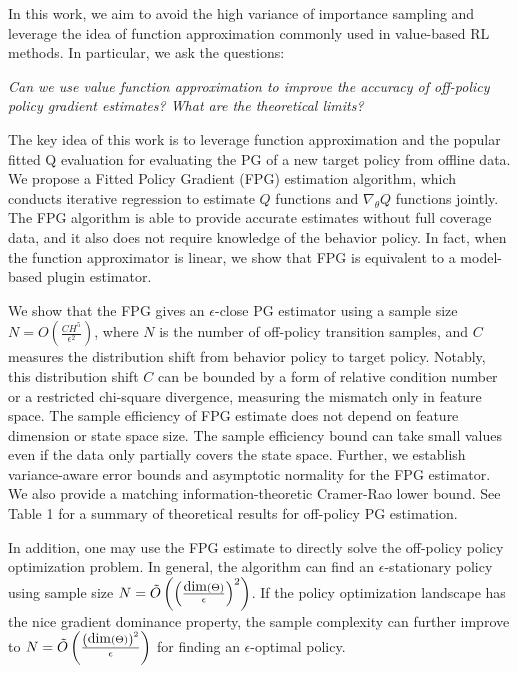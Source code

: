\documentclass{article}
\def\mw#1{\textcolor{red}{#1}}
\numberwithin{equation}{section}
\begin{document}
In this work, we aim to avoid the high variance of importance sampling and leverage the idea of function approximation commonly used in value-based RL methods. In particular, we ask the questions: 
\begin{center}
    \it{Can we use value function approximation to improve the accuracy of off-policy policy gradient estimates? What are the theoretical limits?}
\end{center}
The key idea of this work is to 
leverage function approximation and the popular fitted Q evaluation for evaluating the PG of a new target policy from offline data. We propose a Fitted Policy Gradient (FPG) estimation algorithm, which conducts iterative regression to estimate $Q$ functions and $\nabla_{\theta} Q$ functions jointly. The FPG algorithm is able to provide accurate estimates without full coverage data, and it also does not require knowledge of the behavior policy. 
In fact, when the function approximator is linear, we show that FPG is equivalent to a model-based plugin estimator.

We show that the FPG gives an $\epsilon$-close PG estimator using a sample size 
$N = O\left( {\frac{C H^5}{\epsilon^2}} \right)$,
where $N$ is the number of off-policy transition samples, and $C$ measures the distribution shift from behavior policy to target policy. Notably, this distribution shift $C$ can be bounded by a form of relative condition number or a restricted chi-square divergence, measuring the mismatch only in feature space. The sample efficiency of FPG estimate does not depend on feature dimension or state space size. The sample efficiency bound can take small values even if the data only partially covers the state space.
Further, we establish variance-aware error bounds and asymptotic normality for the FPG estimator. We also provide a matching information-theoretic Cramer-Rao lower bound. See Table 1 for a summary of theoretical results for off-policy PG estimation. 

In addition, one may use the FPG estimate to directly solve the off-policy policy optimization problem. 
In general, the algorithm can find an $\epsilon$-stationary policy using sample size $N = \tilde O\left(\left(\frac{\hbox{dim}(\Theta) }{\epsilon}\right)^2 \right)$. If the policy optimization landscape has the nice gradient dominance property, the sample complexity can further improve to $N = \tilde O\left({\frac{\left(\hbox{dim}(\Theta)\right)^2}{\epsilon}} \right)$ for finding an $\epsilon$-optimal policy. 
\end{document}
